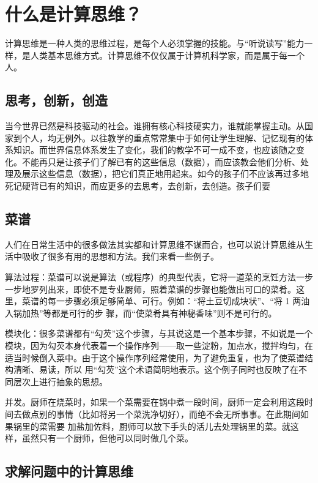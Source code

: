 \section{什么是计算思维？}

计算思维是一种人类的思维过程，是每个人必须掌握的技能。与“听说读写”能力一样，是人类基本思维方式。计算思维不仅仅属于计算机科学家，而是属于每一个人。

\subsection{思考，创新，创造}

当今世界已然是科技驱动的社会。谁拥有核心科技硬实力，谁就能掌握主动。从国家到个人，均无例外。以往教学的重点常常集中于如何让学生理解、记忆现有的体系知识。而世界信息体系发生了变化，我们的教学不可一成不变，也应该随之变化。不能再只是让孩子们了解已有的这些信息（数据），而应该教会他们分析、处理及展示这些信息（数据），把它们真正地用起来。如今的孩子们不应该再过多地死记硬背已有的知识，而应更多的去思考，去创新，去创造。孩子们要

\subsection{菜谱}

人们在日常生活中的很多做法其实都和计算思维不谋而合，也可以说计算思维从生活中吸收了很多有用的思想和方法。我们来看一些例子。 

算法过程：菜谱可以说是算法（或程序）的典型代表，它将一道菜的烹饪方法一步一步地罗列出来，即使不是专业厨师，照着菜谱的步骤也能做出可口的菜肴。这里，菜谱的每一步骤必须足够简单、可行。例如：“将土豆切成块状”、“将 1 两油入锅加热”等都是可行的步 骤，而“使菜肴具有神秘香味”则不是可行的。

模块化：很多菜谱都有“勾芡”这个步骤，与其说这是一个基本步骤，不如说是一个模块，因为勾芡本身代表着一个操作序列——取一些淀粉，加点水，搅拌均匀，在适当时候倒入菜中。由于这个操作序列经常使用，为了避免重复，也为了使菜谱结构清晰、易读，所以 用“勾芡”这个术语简明地表示。这个例子同时也反映了在不同层次上进行抽象的思想。

并发。厨师在烧菜时，如果一个菜需要在锅中煮一段时间，厨师一定会利用这段时间去做点别的事情（比如将另一个菜洗净切好），而绝不会无所事事。在此期间如果锅里的菜需要 加盐加佐料，厨师可以放下手头的活儿去处理锅里的菜。就这样，虽然只有一个厨师，但他可以同时做几个菜。

\subsection{求解问题中的计算思维}

